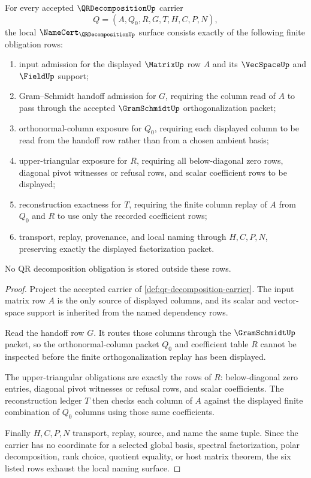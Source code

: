 \begin{theorem}
\label{thm:qr-decomposition-namecert-obligations}
For every accepted $\QRDecompositionUp$ carrier
$$
Q=(A,Q_0,R,G,T,H,C,P,N),
$$
the local $\NameCert_{\QRDecompositionUp}$ surface consists exactly of the following finite obligation rows:
\begin{enumerate}
\item input admission for the displayed $\MatrixUp$ row $A$ and its $\VecSpaceUp$ and $\FieldUp$ support;
\item Gram--Schmidt handoff admission for $G$, requiring the column read of $A$ to pass through the accepted $\GramSchmidtUp$ orthogonalization packet;
\item orthonormal-column exposure for $Q_0$, requiring each displayed column to be read from the handoff row rather than from a chosen ambient basis;
\item upper-triangular exposure for $R$, requiring all below-diagonal zero rows, diagonal pivot witnesses or refusal rows, and scalar coefficient rows to be displayed;
\item reconstruction exactness for $T$, requiring the finite column replay of $A$ from $Q_0$ and $R$ to use only the recorded coefficient rows;
\item transport, replay, provenance, and local naming through $H,C,P,N$, preserving exactly the displayed factorization packet.
\end{enumerate}
No QR decomposition obligation is stored outside these rows.
\end{theorem}
\begin{proof}
Project the accepted carrier of \autoref{def:qr-decomposition-carrier}. The input matrix row $A$ is the only source of displayed columns, and its scalar and vector-space support is inherited from the named dependency rows.

Read the handoff row $G$. It routes those columns through the $\GramSchmidtUp$ packet, so the orthonormal-column packet $Q_0$ and coefficient table $R$ cannot be inspected before the finite orthogonalization replay has been displayed.

The upper-triangular obligations are exactly the rows of $R$: below-diagonal zero entries, diagonal pivot witnesses or refusal rows, and scalar coefficients. The reconstruction ledger $T$ then checks each column of $A$ against the displayed finite combination of $Q_0$ columns using those same coefficients.

Finally $H,C,P,N$ transport, replay, source, and name the same tuple. Since the carrier has no coordinate for a selected global basis, spectral factorization, polar decomposition, rank choice, quotient equality, or host matrix theorem, the six listed rows exhaust the local naming surface.
\end{proof}

